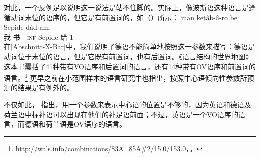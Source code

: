 对此，一个反例足以说明这一说法是站不住脚的。实际上，像波斯语这种语言是遵循动词末位的语序的，但它是有前置词的，如（）所示：
\ea
\gll man ketâb-â-ro be Sepide dâd-am.\\
     我 书-\pl-\RA{} \textsc{inf} Sepide  给-1\sg\\
\z
在\ref{Abschnitt-X-Bar}中，我们说明了德语不能简单地按照这一参数来描写：德语是动词位于末位的语言，但是它既有前置词，也有后置词。《语言结构的世界地图》这本书囊括了41种带有VO语序和后置词的语言，还有14种带有OV语序和前置词的语言\citep{wals-83,wals-85}。\footnote{%
  \url{http://wals.info/combinations/83A_85A\#2/15.0/153.0}，。
} \citet{Dryer92a}更早之前在小范围样本的语言研究中也指出，按照中心语倾向性参数所预测的结果是有例外的。

不仅如此， \citet[]{GW94a}指出，用一个参数来表示中心语的位置是不够的，因为英语和德语及荷兰语中标补语可以出现在他们的补足语前面；不过，英语是一个VO语序的语言，而德语和荷兰语是OV语序的语言。

